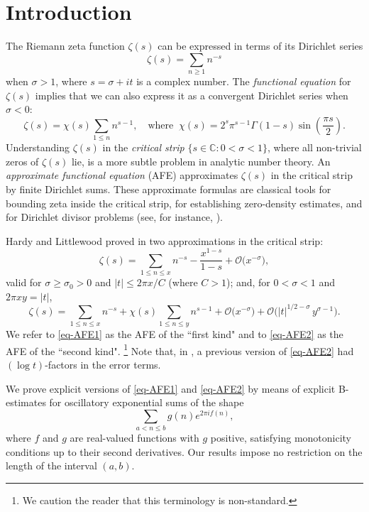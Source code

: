\documentclass[11pt,letterpaper,oneside,reqno]{amsart}
\renewcommand{\^}[1]{\widehat{#1}}
\renewcommand{\O}{{\mathcal{O}}}
\newcommand{\C}{{\mathbb{C}}}
\newcommand{\s}{\sigma}
\numberwithin{equation}{section}
\theoremstyle{remark}
\begin{document}
\tableofcontents

\section{Introduction}
The Riemann zeta function $\zeta(s)$ can be expressed in terms of its Dirichlet series 
\[\zeta(s) = \sum_{ n\ge 1} n^{-s}\] 
when $\sigma>1$, where $s=\sigma+it$ is a complex number. The \textit{functional equation} for $\zeta(s)$ implies that we can also express it as a convergent Dirichlet series when $\sigma <0$:  
\[
\zeta(s) = \chi(s)\sum_{1\le n} n^{s-1}, \quad \text{where }\ 
    \chi(s) = 2^s \pi^{s-1} \Gamma(1-s) \sin\left(\frac{\pi s}{2}\right).
\]
Understanding $\zeta(s)$ in the \textit{critical strip} $\{s\in \C: 0< \s<1\}$, where all non-trivial zeros of $\zeta (s)$ lie, is a more subtle problem in analytic number theory.
An \textit{approximate functional equation} (AFE) approximates $\zeta(s)$ in the critical
strip by finite Dirichlet sums. These approximate formulas are classical tools for bounding zeta inside the critical strip, for establishing zero-density estimates, and for Dirichlet divisor problems (see, for instance, \cite{Titchmarsh}). 
\smallskip

Hardy and Littlewood proved in \cite{HL1921, HL1923}
two approximations in the critical strip: 
\begin{equation}\label{eq-AFE1}
    \zeta(s) = \sum_{1\le n \le x} n^{-s} - \frac{x^{1-s}}{1-s} + \O\big(x^{-\sigma}\big),
\end{equation}
valid for $\sigma \ge \sigma_0 > 0$ and $|t| \le 2\pi x/C$ (where $C>1$); and, for $0 < \sigma < 1$ and $2\pi x y = |t|$, 
\begin{equation}\label{eq-AFE2}
    \zeta(s) = \sum_{1\le n \le x} n^{-s} + \chi(s) \sum_{1\le n \le y} n^{s-1}
    + \O\big( x^{-\sigma}\big) + \O\big( |t|^{1/2-\sigma} \, y^{\sigma-1}\big).
\end{equation}
We refer to
\eqref{eq-AFE1} as the AFE of the ``first kind" and to \eqref{eq-AFE2} as the AFE of the ``second kind".%
\footnote{We caution the reader that this terminology is non-standard.}
Note that, in \cite{HL1921}, a previous version of \eqref{eq-AFE2} had $(\log t)$-factors in the error terms. 
\smallskip

We prove explicit versions of \eqref{eq-AFE1} and \eqref{eq-AFE2} by means of
explicit B-estimates for oscillatory exponential sums of the shape
\begin{equation}\label{def-oscil-exp-sum}
\sum_{a<n\leq b} g(n) e^{2\pi i f(n)},
\end{equation}
where $f$ and $g$ are real-valued functions with $g$ positive, satisfying
monotonicity conditions up to their second derivatives. Our results impose no
restriction on the length of the interval $(a,b)$.
%
\medskip
\end{document}
